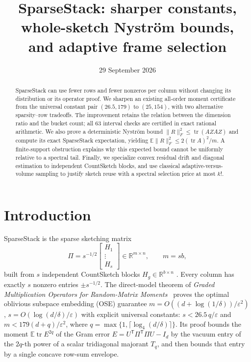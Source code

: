 \documentclass[11pt,a4paper]{article}
\title{SparseStack: sharper constants, whole-sketch Nystr\"om bounds,\\
and adaptive frame selection}
\author{}
\date{29 September 2026}
\theoremstyle{definition}
\theoremstyle{remark}
\newcommand{\E}{\mathbb E}
\newcommand{\R}{\mathbb R}
\newcommand{\tr}{\operatorname{tr}}
\newcommand{\eps}{\varepsilon}
\newcommand{\1}{\mathbf 1}
\newcommand{\T}{\mathsf T}
\begin{document}
\maketitle

\begin{abstract}
SparseStack can use fewer rows and fewer nonzeros per column without
changing its distribution or its operator proof. We sharpen an existing
all-order moment certificate from the universal constant pair
$(26.5,179)$ to $(25,154)$, with two alternative sparsity--row tradeoffs.
The improvement retains the relation between the dimension ratio and
the bucket count; all $63$ interval checks are certified in exact
rational arithmetic. We also prove a deterministic Nystr\"om bound
$\|R\|_F^2\le\operatorname{tr}(AZAZ)$ and compute its exact SparseStack
expectation, yielding $\mathbb E\|R\|_F^2\le2(\operatorname{tr}A)^2/m$.
A finite-support obstruction explains why this expected bound cannot be
uniformly relative to a spectral tail. Finally, we specialize convex
residual drift and diagonal estimation to independent CountSketch blocks,
and use classical adaptive-versus-volume sampling to justify sketch
reuse with a spectral selection price at most $k!$.
\end{abstract}

\tableofcontents

\section{Introduction}\label{sec:intro}

SparseStack is the sparse sketching matrix
\[
 \Pi=s^{-1/2}\begin{bmatrix}H_1\\ \vdots\\ H_s\end{bmatrix}\in\R^{m\times n},
 \qquad m=sb,
\]
built from $s$ independent CountSketch blocks $H_g\in\R^{b\times n}$
\cite{CharikarChenFarachColton2002,KaneNelson2014,NelsonNguyen2013}.
Every column has exactly $s$ nonzero entries $\pm s^{-1/2}$. The direct-model theorem of
\emph{Graded Multiplication Operators for Random-Matrix
Moments}~\cite[Theorem~10.6 and Appendix~B]{SS} proves the optimal oblivious subspace embedding (OSE) guarantee
$m=O((d+\log(1/\delta))/\eps^2)$, $s=O(\log(d/\delta)/\eps)$ with explicit
universal constants: $s<26.5\,q/\eps$ and $m<179(d+q)/\eps^2$, where
$q=\max\{1,\lceil\log_4(d/\delta)\rceil\}$. Its proof bounds the moment
$\E\tr E^{2q}$ of the Gram error $E=U^\T\Pi^\T\Pi U-I_d$ by the vacuum
entry of the $2q$-th power of a scalar tridiagonal majorant $T_q$, and
then bounds that entry by a single concave row-sum envelope.
\end{document}

